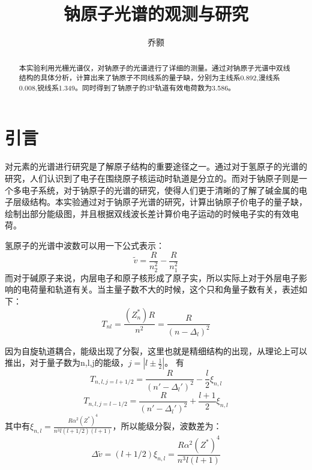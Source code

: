 \documentclass[aps,pre,12pt,preprint,onecolumn,showpacs,showkeys,UTF8]{revtex4-1}
\begin{document}
\title{\bf\heiti{}钠原子光谱的观测与研究\vspace{15mm}}
\author{\fangsong 乔颢\vspace{2mm}}
\begin{abstract}
	\vspace{10mm}
	\begin{spacing}{1.5}
		\songti{}
		本实验利用光栅光谱仪，对钠原子的光谱进行了详细的测量。通过对钠原子光谱中双线结构的具体分析，计算出来了钠原子不同线系的量子缺，分别为主线系0.892,漫线系0.008,锐线系1.349。同时得到了钠原子的3P轨道有效电荷数为3.586。
	\end{spacing}
\end{abstract}

\maketitle

\section{引言}
对元素的光谱进行研究是了解原子结构的重要途径之一。通过对于氢原子的光谱的研究，人们认识到了电子在围绕原子核运动时轨道是分立的。而对于钠原子则是一个多电子系统，对于钠原子的光谱的研究，使得人们更于清晰的了解了碱金属的电子层级结构。本实验通过对于钠原子光谱的研究，计算出钠原子价电子的量子缺，绘制出部分能级图，并且根据双线波长差计算价电子运动的时候电子实的有效电荷。

氢原子的光谱中波数可以用一下公式表示：
\begin{equation}
	\tilde{v}=\frac{R}{n_2^2}-\frac{R}{n_1^2}
\end{equation}
而对于碱原子来说，内层电子和原子核形成了原子实，所以实际上对于外层电子影响的电荷量和轨道有关。当主量子数不大的时候，这个只和角量子数有关，表述如下：
\begin{equation}
	T_{nl}=\frac{(Z_n^*)R}{n^2}=\frac{R}{(n-\Delta_l)^2}
\end{equation}

因为自旋轨道耦合，能级出现了分裂，这里也就是精细结构的出现，从理论上可以推出，对于量子数为n,l,j的能级，$j=|l\pm\frac{1}{2}|$。 有
\begin{equation}
	T_{n,l,j=l+1/2}=\frac{R}{(n'-\Delta_l')^2}-\frac{l}{2}\xi_{n,l}
\end{equation}
\begin{equation}
	T_{n,l,j=l-1/2}=\frac{R}{(n'-\Delta_l')^2}+\frac{l+1}{2}\xi_{n,l}
\end{equation}
其中有$\xi_{n,l}=\frac{R \alpha^2(Z^*)^4}{n^3l(l+1/2)(l+1)}$，所以能级分裂，波数差为：
\begin{equation}
	\Delta \tilde{v}=(l+1/2)\xi_{n,l}=\frac{R\alpha^2(Z^*)^4}{n^3l(l+1)}
\end{equation}
\end{document}
